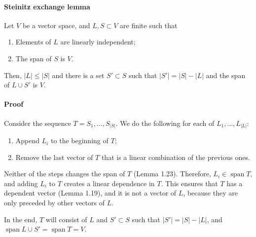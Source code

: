\documentclass{article}
\begin{document}
\paragraph{Steinitz exchange lemma} Let $V$ be a vector space, and $L, S \subset V$ are finite such that

\begin{enumerate}
    \item Elements of $L$ are linearly independent;
    \item The span of $S$ is $V$.
\end{enumerate}

Then, $|L| \leq |S|$ and there is a set $S' \subset S$ such that $|S'| = |S| - |L|$ and the span of $L \cup S'$ is $V$.    

\paragraph{Proof}

Consider the sequence $T=S_1,\dots,S_{|S|}$. We do the following for each of $L_1,\dots,L_{|L|}$:

\begin{enumerate}
    \item Append $L_i$ to the beginning of $T$;
    \item Remove the last vector of $T$ that is a linear combination of the previous ones.
\end{enumerate}

Neither of the steps changes the span of $T$ (Lemma 1.23). Therefore, $L_i \in \operatorname{span} T$, and adding $L_i$ to $T$ creates a linear dependence in $T$. This ensures that $T$ has a dependent vector (Lemma 1.19), and it is not a vector of $L$, because they are only preceded by other vectors of $L$.

In the end, $T$ will consist of $L$ and $S' \subset S$ such that $|S'| = |S| - |L|$, and $\operatorname{span} L \cup S' = \operatorname{span} T = V$.
\end{document}
